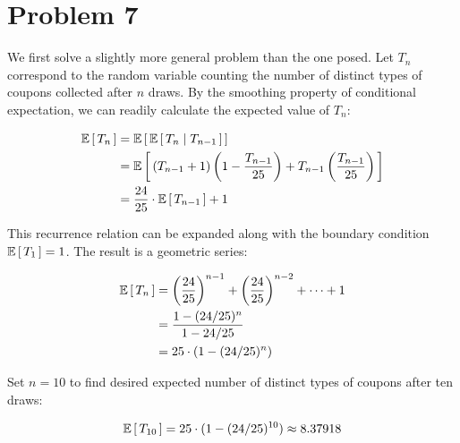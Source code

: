 \documentclass[12pt]{article}%
\begin{document}
\section{Problem 7}

We first solve a slightly more general problem than the one posed. Let $T_n$ correspond to the random variable counting the number of distinct types of coupons collected after $n$ draws. By the smoothing property of conditional expectation, we can readily calculate the expected value of $T_n$:

\begin{align*}
  \mathbb{E}\left[\,T_n\,\right] & = \mathbb{E}\left[\,\mathbb{E}\left[\,T_n \mid T_{n-1}\,\right]\,\right] \\
  & = \mathbb{E}\left[\,(T_{n-1} + 1)\left(1 - \frac{T_{n-1}}{25}\right) + T_{n-1}\left(\frac{T_{n-1}}{25}\right)\,\right] \\
  & = \frac{24}{25}\cdot\mathbb{E}\left[\,T_{n-1}\,\right] + 1
\end{align*}

This recurrence relation can be expanded along with the boundary condition $\mathbb{E}\left[\,T_1\,\right] = 1$. The result is a geometric series:

\begin{align*}
  \mathbb{E}\left[\,T_n\,\right] & = \left(\frac{24}{25}\right)^{n-1} + \left(\frac{24}{25}\right)^{n-2} + \cdots + 1 \\
    & = \frac{1 - (24/25)^n}{1 - 24/25} \\
    & = 25\cdot (1 - (24/25)^n)
\end{align*}

Set $n = 10$ to find desired expected number of distinct types of coupons after ten draws:

\[ \mathbb{E}\left[\,T_{10}\,\right] = 25\cdot (1 - (24/25)^{10}) \approx 8.37918\]
\end{document}
